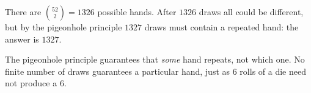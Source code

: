 There are $\binom{52}2=1326$ possible hands. After $1326$ draws all could be different, but by the pigeonhole principle $1327$ draws must contain a repeated hand: the answer is $\boxed{1327}$.

The pigeonhole principle guarantees that \emph{some} hand repeats, not which one. No finite number of draws guarantees a particular hand, just as $6$ rolls of a die need not produce a $6$.
